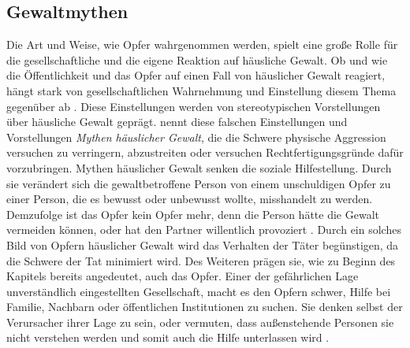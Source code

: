 \subsection{Gewaltmythen}   \label{subsec_2.1.3}
Die Art und Weise, wie Opfer wahrgenommen werden, spielt eine große Rolle für die gesellschaftliche und die eigene Reaktion auf häusliche Gewalt. Ob und wie die Öffentlichkeit und das Opfer auf einen Fall von häuslicher Gewalt reagiert, hängt stark von gesellschaftlichen Wahrnehmung und Einstellung diesem Thema gegenüber ab \parencite{Labelingtheory_plus}. Diese Einstellungen werden von stereotypischen Vorstellungen über häusliche Gewalt geprägt. \textcite{DVMAS_Peters} nennt diese falschen Einstellungen und Vorstellungen \textit{Mythen häuslicher Gewalt}, die die Schwere physische Aggression versuchen zu verringern, abzustreiten oder versuchen Rechtfertigungsgründe dafür vorzubringen. Mythen häuslicher Gewalt senken die soziale Hilfestellung. Durch sie verändert sich die gewaltbetroffene Person von einem unschuldigen Opfer zu einer Person, die es bewusst oder unbewusst wollte, misshandelt zu werden. Demzufolge ist das Opfer kein Opfer mehr, denn die Person hätte die Gewalt vermeiden können, oder hat den Partner willentlich provoziert \parencite{DVMAS_Peters}. Durch ein solches Bild von Opfern häuslicher Gewalt wird das Verhalten der Täter begünstigen, da die Schwere der Tat minimiert wird. Des Weiteren prägen sie, wie zu Beginn des Kapitels bereits angedeutet, auch das Opfer. Einer der gefährlichen Lage unverständlich eingestellten Gesellschaft, macht es den Opfern schwer, Hilfe bei Familie, Nachbarn oder öffentlichen Institutionen zu suchen. Sie denken selbst der Verursacher ihrer Lage zu sein, oder vermuten, dass außenstehende Personen sie nicht verstehen werden und somit auch die Hilfe unterlassen wird \parencite{Gewaltmythen}.


